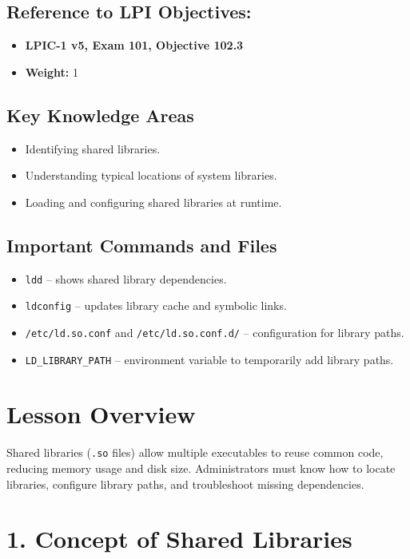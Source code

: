 \documentclass[12pt,a4paper]{report}
\begin{document}
\subsection*{Reference to LPI Objectives:}
\begin{itemize}
    \item \textbf{LPIC-1 v5, Exam 101, Objective 102.3}
    \item \textbf{Weight:} 1
\end{itemize}

\subsection*{Key Knowledge Areas}
\begin{itemize}
    \item Identifying shared libraries.
    \item Understanding typical locations of system libraries.
    \item Loading and configuring shared libraries at runtime.
\end{itemize}

\subsection*{Important Commands and Files}
\begin{itemize}
    \item \texttt{ldd} – shows shared library dependencies.
    \item \texttt{ldconfig} – updates library cache and symbolic links.
    \item \texttt{/etc/ld.so.conf} and \texttt{/etc/ld.so.conf.d/} – configuration for library paths.
    \item \texttt{LD\_LIBRARY\_PATH} – environment variable to temporarily add library paths.
\end{itemize}

\section*{Lesson Overview}

Shared libraries (\texttt{.so} files) allow multiple executables to reuse common code, reducing memory usage and disk size. Administrators must know how to locate libraries, configure library paths, and troubleshoot missing dependencies.

\section*{1. Concept of Shared Libraries}
\end{document}
